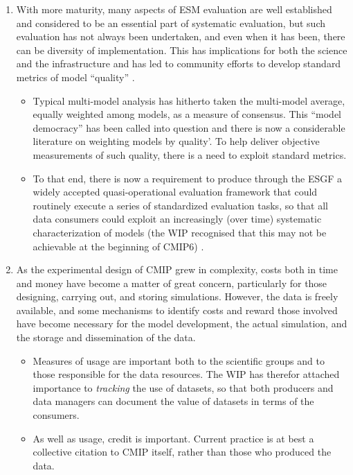 \documentclass[gmd,manuscript]{copernicus}
\newcommand{\pipref}[1] {\citep{ref:#1}}
\begin{document}
\begin{enumerate}
\begin{itemize}
  \end{itemize}
\item\label{analysis} With more maturity, many aspects of ESM evaluation
are well established and considered to be an essential part of systematic
evaluation, but such evaluation has not always been undertaken, and even
when it has been, there can be diversity of implementation. This has
implications for both the science and the infrastructure and has 
  led to community efforts to develop standard metrics of model
  ``quality'' \citep{ref:eyringetal2016,ref:gleckleretal2016}. 
  \begin{itemize}\item Typical multi-model analysis has hitherto taken
  the multi-model average, equally weighted among models, as a measure
  of consensus. This ``model democracy'' \pipref{knutti2010} has been
  called into question and there is now a considerable literature on
  weighting models by quality'\pipref{knuttietal2017}.  To help
  deliver objective measurements of such quality, there is a need to 
  exploit standard metrics.
  \item To that end, there is now a requirement to produce through the ESGF a widely accepted
quasi-operational evaluation framework that could routinely execute a series of standardized evaluation
tasks, so that all data consumers could exploit an increasingly (over time) systematic characterization
of models (the WIP recognised that this may not be achievable at the beginning of CMIP6) .
  \end{itemize}
\item As the experimental design of CMIP grew in complexity,  costs both 
in time and money have become a matter of great concern, particularly
for those designing, carrying out, and storing simulations. However,
the data is freely available, and some mechanisms to identify
costs and reward those involved have become necessary
for the model development, the actual simulation, and the storage and
dissemination of the data.
\begin{itemize} \item Measures of usage are important both to the 
  scientific groups and to those responsible for the data resources.
  The WIP has therefor attached importance to \emph{tracking} the use of datasets, 
  so that both producers and data managers can document the
  value of datasets in terms of the consumers.  
  \item As well as usage, credit is important. Current practice is at best a collective
  citation to CMIP itself, rather than those who produced the data.

\end{itemize}
\end{enumerate}
\end{document}
